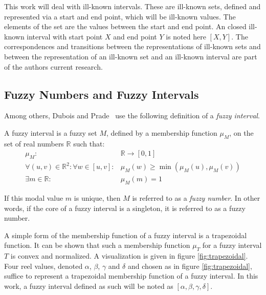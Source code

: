 This work will deal with ill-known intervals. These are ill-known sets, defined and represented via a start and end point, which will be ill-known values. The elements of the set are the values between the start and end point. An closed ill-known interval with start point $X$ and end point $Y$ is noted here $\left[X, Y\right]$. The correspondences and transitions between the representations of ill-known sets and between the representation of an ill-known set and an ill-known interval are part of the authors current research.

\subsection{\label{subsec:fuzzy-numbers}Fuzzy Numbers and Fuzzy Intervals}
Among others, Dubois and Prade~\cite{Dubois1983} use the following definition of a \emph{fuzzy interval}.
\begin{definition}
A fuzzy interval is a fuzzy set $M$, defined by a membership function $\mu_{M}$, on the set of real numbers $\mathbb{R}$ such that:
\begin{eqnarray}
\mu_{M} : & \!\!\!\!\!\!\!\!\!\!\!\!\!\!\!\!\!\!\!\!\!\!\!\!\!\!\!\!\!\!\!\!\!\!\!\!\!\!\!\!\!\!\!\!\!\!\!\!\!\! \mathbb{R} \rightarrow \left[0,1\right] \nonumber \\ 
\forall (u,v)\in\mathbb{R}^2: \forall w \in [u,v]:&\mu_M(w) \geq\min(\mu_M(u),\mu_M(v))  \\
\exists m \in \mathbb{R} : & \!\!\!\!\!\!\!\!\!\!\!\!\!\!\!\!\!\!\!\!\!\!\!\!\!\!\!\!\!\!\!\!\!\!\!\!\!\!\!\!\!\!\!\!\!\!\!\! \mu_M(m)=1 
\end{eqnarray}
\end{definition}
If this modal value $m$ is unique, then $M$ is referred to as a \emph{fuzzy number}. In other words, if the core of a fuzzy interval is a singleton, it is referred to as a fuzzy number.

A simple form of the membership function of a fuzzy interval is a trapezoidal function. It can be shown that such a membership function $\mu_T$ for a fuzzy interval $T$ is convex and normalized. A visualization is given in figure \ref{fig:trapezoidal}. Four reel values, denoted $\alpha$, $\beta$, $\gamma$ and $\delta$ and chosen as in figure \ref{fig:trapezoidal}, suffice to represent a trapezoidal membership function of a fuzzy interval. In this work, a fuzzy interval defined as such will be noted as $\left[\alpha, \beta, \gamma, \delta\right]$. %

